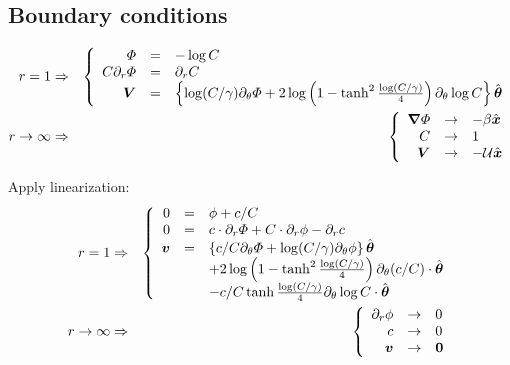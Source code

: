 \subsection{Boundary conditions}
\begin{eqnarray}
r = 1 &\Rightarrow&
\brc{rcl}{
  \varPhi & = & -\log C \\
  C \partial_r {\varPhi} & = & \partial_r {C} \\
  \bV & = & \left\{\log (C/\gamma) \partial_\theta \varPhi +
  2 \log\left(1 - \tanh^2 \frac{\log (C/\gamma)}{4}\right)
  \partial_\theta \log C \right\} \bthetahat
}
\\
r \rightarrow \infty &\Rightarrow&
\brc{rcl}{
  \bnabla \varPhi &\rightarrow& -\beta \bxhat \\
  C &\rightarrow& 1 \\
  \bV &\rightarrow& -\mathcal{U} \bxhat
}
\end{eqnarray}

Apply linearization:
\begin{eqnarray}
r = 1 &\Rightarrow&
\brc{rcl}{
  0 & = & \phi + {c / C} \\
  0 &=& c\cdot \partial_r{\varPhi} + C\cdot\partial_r {\phi}-\partial_r{c} \\
  \bv & = & \left\{c/C \partial_\theta \varPhi +
  \log (C/\gamma) \partial_\theta \phi \right\}\bthetahat
  \\ & &
  + 2 \log\left(1 - \tanh^2 \frac{\log (C/\gamma)}{4}\right)
  \partial_\theta (c/C) \cdot \bthetahat
  \\ & &
  - c/C \tanh \frac{\log (C/\gamma)}{4}
  \partial_\theta \log C \cdot \bthetahat
}
\\
r \rightarrow \infty &\Rightarrow&
\brc{rcl}{
  \partial_r \phi &\rightarrow& 0 \\
  c &\rightarrow& 0 \\
  \bv &\rightarrow& \bzero
}
\end{eqnarray}
